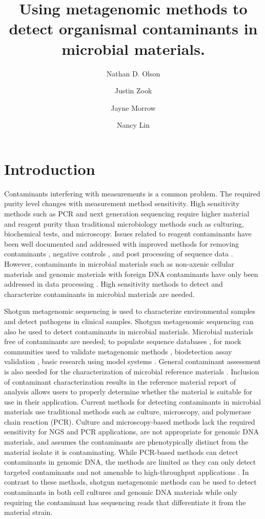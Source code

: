\documentclass[fleqn,10pt,lineno]{wlpeerj}\usepackage[]{graphicx}\usepackage[]{color}
\title{Using metagenomic methods to detect organismal contaminants in microbial materials.}
\author[1]{Nathan D. Olson}
\author[1]{Justin Zook}
\author[1]{Jayne Morrow}
\author[1]{Nancy Lin}
\affil[1]{Material Measurement Laboratory, National Institute of Standards and Technology}
\begin{document}
\flushbottom
\maketitle
\thispagestyle{empty}

\section*{Introduction}
Contaminants interfering with measurements is a common problem. 
The required purity level changes with measurement method sensitivity. 
High sensitivity methods such as PCR and next generation sequencing require higher material and reagent purity than traditional microbiology methods such as culturing, biochemical tests, and microscopy. 
Issues related to reagent contaminants have been well documented and addressed with improved methods for removing contaminants \citep{woyke2011decontamination,motley2014improved}, negative controls \citep{jervis2015deriving}, and post processing of sequence data \citep{mukherjee2015large}. 
However, contaminants in microbial materials such as non-axenic cellular materials \citep{Shrestha2013} and genomic materials with foreign DNA contaminants have only been addressed in data processing \citep{tennessen2015prodege}. 
High sensitivity methods to detect and characterize contaminants in microbial materials are needed.  

Shotgun metagenomic sequencing is used to characterize environmental samples and detect pathogens in clinical samples.
Shotgun metagenomic sequencing can also be used to detect contaminants in microbial materials. 
Microbial materials free of contaminants are needed; to populate sequence databases \citep{parks2015checkm}, for mock communities used to validate metagenomic methods \citep{bokulich2016mockrobiota}, biodetection assay validation \citep{Ieven2013,International2011}, basic research using model systems \citep{Shrestha2013}. 
General contaminant assessment is also needed for the characterization of microbial reference materials \citep{olson2016pepr}. 
Inclusion of contaminant characterization results in the reference material report of analysis allows users to properly determine whether the material is suitable for use in their application. 
Current methods for detecting contaminants in microbial materials use traditional methods such as culture, microscopy, and polymerase chain reaction (PCR). 
Culture and microscopy-based methods lack the required sensitivity for NGS and PCR applications, are not appropriate for genomic DNA materials, and assumes the contaminants are phenotypically distinct from the material isolate it is contaminating. 
While PCR-based methods can detect contaminants in genomic DNA, the methods are limited as they can only detect targeted contaminants and not amenable to high-throughput applications \citep{heck2016evaluating,Marron2013}. 
In contrast to these methods, shotgun metagenomic methods can be used to detect contaminants in both cell cultures and genomic DNA materials while only requiring the contaminant has sequencing reads that differentiate it from the material strain. 
\end{document}
